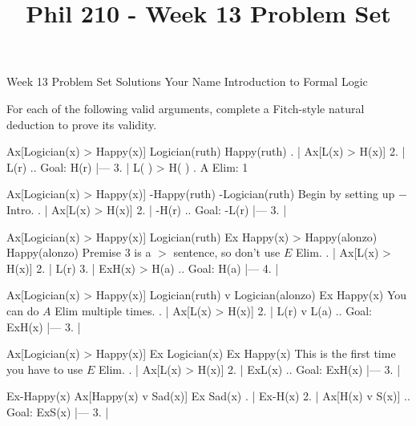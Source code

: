 
\title{Phil 210 - Week 13 Problem Set}

\heading
Week 13 Problem Set Solutions
Your Name
Introduction to Formal Logic
\endheading

For each of the following valid arguments, complete a Fitch-style natural deduction to prove its validity.

\quantifiers
\problems
{}
\argument
 Ax[Logician(x) > Happy(x)]
 Logician(ruth) 
\argumentline
 Happy(ruth) 
\endargument
	\answer
	. | Ax[L(x) > H(x)]
	 2. | L(r)             ..  Goal: H(r)
	    |---
	 3. | L( ) > H( )      .  A Elim: 1
	\endfitchproof
	\endanswer

\argument
 Ax[Logician(x) > Happy(x)]
 -Happy(ruth) 
\argumentline
 -Logician(ruth) 
\endargument
\Hint Begin by setting up $-$ Intro.
	\answer
	. | Ax[L(x) > H(x)]
	 2. | -H(r)             ..  Goal: -L(r)
	    |---
	 3. | 
	\endfitchproof
	\endanswer

\argument
 Ax[Logician(x) > Happy(x)]
 Logician(ruth)
 Ex Happy(x) > Happy(alonzo)
\argumentline
 Happy(alonzo) 
\endargument
\Hint Premise 3 is a $>$ sentence, so don't use $E$ Elim.
	\answer
	. | Ax[L(x) > H(x)]
	 2. | L(r)
	 3. | ExH(x) > H(a)    ..  Goal: H(a)
	    |---
	 4. |
	\endfitchproof
	\endanswer

\argument
 Ax[Logician(x) > Happy(x)]
 Logician(ruth) v Logician(alonzo)
\argumentline
 Ex Happy(x)
\endargument
\Hint You can do $A$ Elim multiple times.
	\answer
	. | Ax[L(x) > H(x)]
	 2. | L(r) v L(a)      ..  Goal: ExH(x)
	    |---
	 3. | 
	\endfitchproof
	\endanswer

\argument
 Ax[Logician(x) > Happy(x)]
 Ex Logician(x)
\argumentline
 Ex Happy(x)
\endargument
\Hint This is the first time you have to use $E$ Elim.
	\answer
	. | Ax[L(x) > H(x)]
	 2. | ExL(x)           ..  Goal: ExH(x)
	    |---
	 3. | 
	\endfitchproof
	\endanswer

\argument
 Ex-Happy(x)
 Ax[Happy(x) v Sad(x)]
\argumentline
 Ex Sad(x)
\endargument
	\answer
	. | Ex-H(x)
	 2. | Ax[H(x) v S(x)]  ..  Goal: ExS(x)
	    |---
	 3. | 
	\endfitchproof
	\endanswer

\endproblems
\bye

